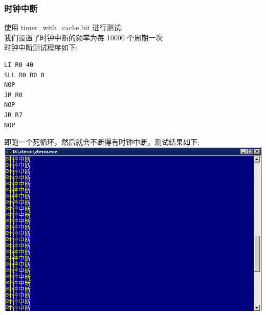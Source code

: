 \documentclass[10pt]{article}
\begin{document}
\begin{CJK}{UTF8}{gbsn}
\subsubsection{时钟中断}
使用 timer\_with\_cache.bit 进行测试:\\
我们设置了时钟中断的频率为每 10000 个周期一次\\
时钟中断测试程序如下:\\
\begin{verbatim}
LI R0 40
SLL R0 R0 0
NOP
JR R0
NOP
JR R7
NOP
\end{verbatim}
即跑一个死循环，然后就会不断得有时钟中断，测试结果如下:\\
\includegraphics[width=\linewidth]{clk_int.png}


\end{CJK}
\end{document}

